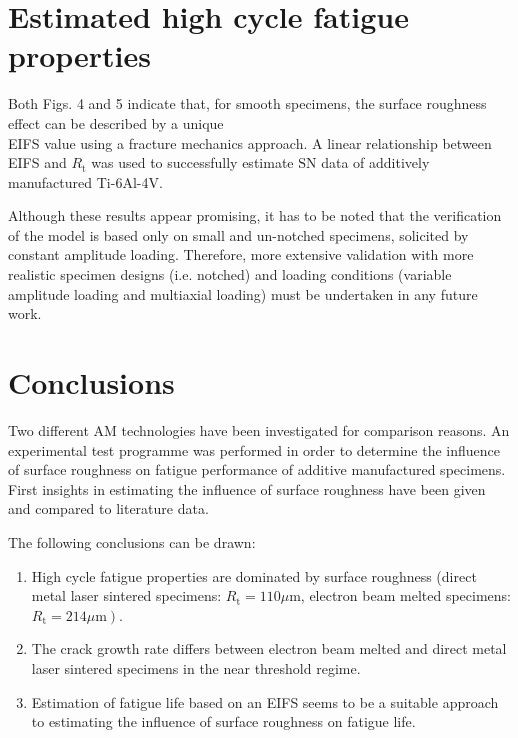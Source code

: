 \documentclass[10pt]{article}
\begin{document}
\section*{Estimated high cycle fatigue properties}
Both Figs. 4 and 5 indicate that, for smooth specimens, the surface roughness effect can be described by a unique\\
EIFS value using a fracture mechanics approach. A linear relationship between EIFS and $R_{\mathrm{t}}$ was used to successfully estimate $\mathrm{SN}$ data of additively manufactured Ti-6Al-4V.

Although these results appear promising, it has to be noted that the verification of the model is based only on small and un-notched specimens, solicited by constant amplitude loading. Therefore, more extensive validation with more realistic specimen designs (i.e. notched) and loading conditions (variable amplitude loading and multiaxial loading) must be undertaken in any future work.

\section*{Conclusions}
Two different AM technologies have been investigated for comparison reasons. An experimental test programme was performed in order to determine the influence of surface roughness on fatigue performance of additive manufactured specimens. First insights in estimating the influence of surface roughness have been given and compared to literature data.

The following conclusions can be drawn:

\begin{enumerate}
  \item High cycle fatigue properties are dominated by surface roughness (direct metal laser sintered specimens: $R_{\mathrm{t}}=110 \mu \mathrm{m}$, electron beam melted specimens: $\left.R_{\mathrm{t}}=214 \mu \mathrm{m}\right)$.

  \item The crack growth rate differs between electron beam melted and direct metal laser sintered specimens in the near threshold regime.

  \item Estimation of fatigue life based on an EIFS seems to be a suitable approach to estimating the influence of surface roughness on fatigue life.

\end{enumerate}
\end{document}
